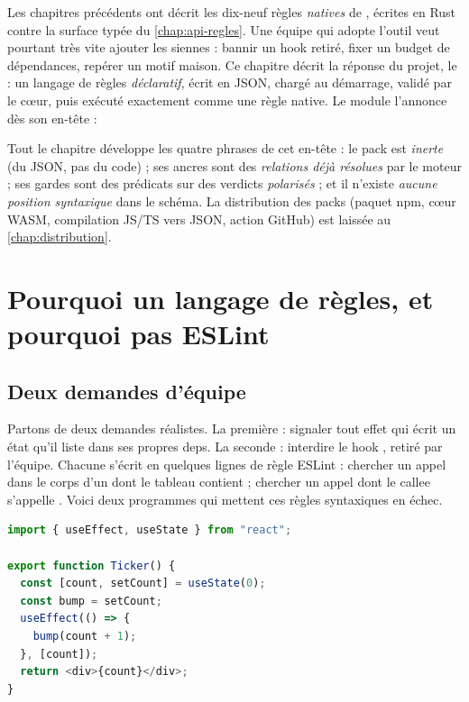 Les chapitres précédents ont décrit les dix-neuf règles \emph{natives} de \reactant{}, écrites en Rust contre la surface typée du \cref{chap:api-regles}. Une équipe qui adopte l'outil veut pourtant très vite ajouter les siennes : bannir un hook retiré, fixer un budget de dépendances, repérer un motif maison. Ce chapitre décrit la réponse du projet, le  : un langage de règles \emph{déclaratif}, écrit en JSON, chargé au démarrage, validé par le cœur, puis exécuté exactement comme une règle native. Le module l'annonce dès son en-tête :


Tout le chapitre développe les quatre phrases de cet en-tête : le pack est \emph{inerte} (du JSON, pas du code) ; ses ancres sont des \emph{relations déjà résolues} par le moteur ; ses gardes sont des prédicats sur des verdicts \emph{polarisés} ; et il n'existe \emph{aucune position syntaxique} dans le schéma. La distribution des packs (paquet npm, cœur WASM, compilation JS/TS vers JSON, action GitHub) est laissée au \cref{chap:distribution}.

\section{Pourquoi un langage de règles, et pourquoi pas ESLint}
\label{sec:regles-declaratives-pourquoi}

\subsection{Deux demandes d'équipe}

Partons de deux demandes réalistes. La première : \og signaler tout effet qui écrit un état qu'il liste dans ses propres deps\fg{}. La seconde : \og interdire le hook , retiré par l'équipe\fg{}. Chacune s'écrit en quelques lignes de règle ESLint : chercher un appel  dans le corps d'un  dont le tableau contient  ; chercher un appel dont le callee s'appelle . Voici deux programmes qui mettent ces règles syntaxiques en échec.

\begin{lstlisting}[language=TypeScript,caption={Un setter aliasé (\file{/tmp/ch22/alias.tsx})},label={lst:decl-alias}]
import { useEffect, useState } from "react";

export function Ticker() {
  const [count, setCount] = useState(0);
  const bump = setCount;
  useEffect(() => {
    bump(count + 1);
  }, [count]);
  return <div>{count}</div>;
}
\end{lstlisting}

